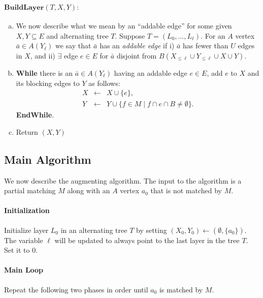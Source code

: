 \documentclass[11pt]{article}
\theoremstyle{definition}
\theoremstyle{remark}
\begin{document}
\paragraph{$\textbf{BuildLayer}(T, X, Y):$}
\begin{enumerate}[(a)]
\item We now describe what we mean by an ``addable edge'' for some
  given $X, Y \subseteq E$ and alternating tree $T$. Suppose $T = (L_0, \dots, L_\ell)$. For an $A$ vertex
  $\bar{a} \in A(Y_{\ell})$ we say that $\bar{a}$ has an \emph{addable
    edge} if i) $\bar{a}$ has fewer than $U$ edges in $X$, and ii)
  $\exists$ edge $e \in E$ for $\bar{a}$ disjoint from
  $B(X_{\leq \ell}\cup Y_{\leq \ell} \cup X \cup Y)$.
\item
    \textbf{While} there is an $\bar{a} \in A(Y_{\ell})$ having an
    addable edge $e \in E$, add $e$ to $X$ and its blocking
    edges to $Y$ as follows:
    \begin{eqnarray*}
      X &\leftarrow& X \cup \{ e \}, \\
      Y &\leftarrow& Y \cup \{f \in M \; | \; f \cap e
                              \cap B \neq \emptyset \}.
    \end{eqnarray*}
    \textbf{EndWhile}.
\item Return $(X, Y)$
\end{enumerate}

\subsection{Main Algorithm}\label{section:augmenting2}

We now describe the augmenting algorithm. The input to the algorithm
is a partial matching $M$ along with an $A$ vertex $a_0$ that is not
matched by $M$.

\paragraph{Initialization} Initialize layer $L_0$ in an alternating
tree $T$ by setting $(X_0, Y_0) \leftarrow (\emptyset, \{a_0\})$. The
variable $\ell$ will be updated to always point to the last layer in
the tree $T$. Set it to $0$.

\paragraph{Main Loop} Repeat the following two phases in order until
$a_0$ is matched by $M$.
\end{document}
